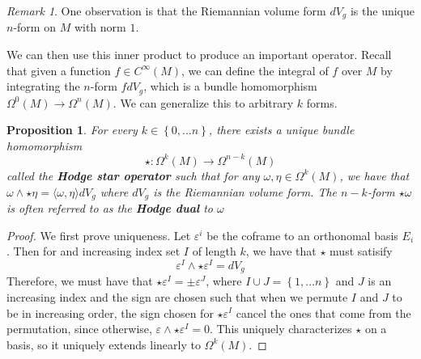 \documentclass[psamsfonts]{amsart}
\newtheorem{prop}[thm]{Proposition}
\theoremstyle{definition}
\theoremstyle{remark}
\newtheorem*{rem*}{Remark}
\newcommand{\ib}[1]{\textbf{\textit{#1}}}
\newcommand{\set}[1]{\left\lbrace#1 \right\rbrace}
\begin{document}
\begin{rem*}
One observation is that the Riemannian volume form $dV_g$  is the unique $n$-form on $M$ with norm $1$.
\end{rem*}
We can then use this inner product to produce an important operator. Recall that given a function $f \in C^\infty(M)$, we can define the integral of $f$ over $M$ by integrating the $n$-form $fdV_g$, which is a bundle homomorphism $\Omega^0(M) \to \Omega^n(M)$. We can generalize this to arbitrary $k$ forms.
\begin{prop}
For every $k \in \set{0, \ldots  n}$, there exists a unique bundle homomorphism
$$\star: \Omega^{k}(M) \to \Omega^{n-k}(M)$$
called the \ib{Hodge star operator} such that for any $\omega, \eta  \in \Omega^k(M)$, we have that $\omega \wedge \star\eta = \langle \omega, \eta \rangle dV_g$ where $dV_g$ is the Riemannian volume form. The $n-k$-form $\star \omega$ is often referred to as the \ib{Hodge dual} to $\omega$
\end{prop}
\begin{proof}
We first prove uniqueness. Let $\varepsilon^i$  be the coframe to an orthonomal basis $E_i$. Then for and increasing index set $I$ of length $k$, we have that $\star$ must satisify 
$$\varepsilon^I \wedge \star \varepsilon^I = dV_g$$
Therefore, we must have that $\star \varepsilon^I = \pm \varepsilon^J$, where $I \cup J = \set{1, \ldots n}$ and $J$ is an increasing index and the sign are chosen such that when we permute $I$ and $J$ to be in increasing order, the sign chosen for $\star \varepsilon^I$ cancel the ones that come from the permutation, since otherwise, $\varepsilon \wedge \star \varepsilon^I = 0$. This uniquely characterizes $\star$ on a basis, so it uniquely extends linearly to $\Omega^k(M)$.
\end{proof}
\end{document}
